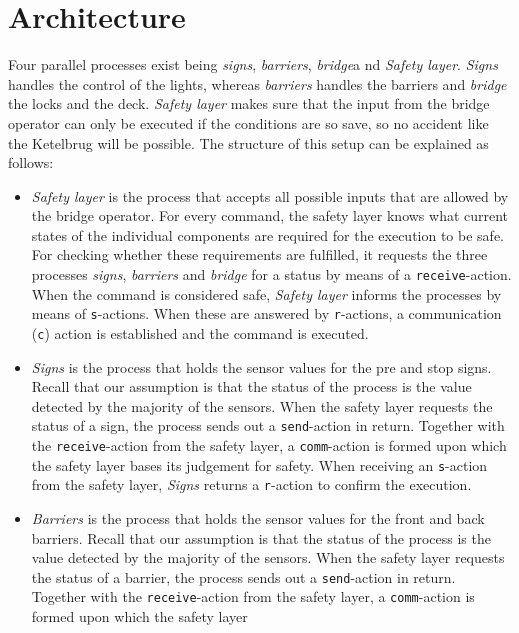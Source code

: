 \section{Architecture}
\label{sec:arch}

Four parallel processes exist being \emph{signs}, \emph{barriers},  \emph{bridge}a nd \emph{Safety layer}. \emph{Signs} handles the control of the lights, whereas \emph{barriers} handles the barriers and \emph{bridge} the locks and the deck. \emph{Safety layer} makes sure that the input from the bridge operator can only be executed if the conditions are so save, so no accident like the Ketelbrug will be possible. The structure of this setup can be explained as follows:
%
\begin{itemize}
	\item \emph{Safety layer} is the process that accepts all possible inputs that are allowed by the bridge operator. For every command, the safety layer knows what current states of the individual components are required for the 
	execution to be safe. For checking whether these requirements are fulfilled, it requests the three processes \emph{signs}, \emph{barriers} and \emph{bridge} for a status by means of a \texttt{receive}-action. 
	When the command is considered safe, \emph{Safety layer} informs the processes by means of \texttt{s}-actions. When these are answered by \texttt{r}-actions, a communication (\texttt{c}) action is established and the command 
	is executed.
	\item \emph{Signs} is the process that holds the sensor values for the pre and stop signs. Recall that our assumption is that the status of the process is the value detected by the majority of the sensors. When the safety layer 
	requests the status of a sign, the process sends out a \texttt{send}-action in return. Together with the \texttt{receive}-action from the safety layer, a \texttt{comm}-action is formed upon which the safety layer bases its 
	judgement for safety. When receiving an \texttt{s}-action from the safety layer, \emph{Signs} returns a \texttt{r}-action to confirm the execution.
	\item \emph{Barriers} is the process that holds the sensor values for the front and back barriers. Recall that our assumption is that the status of the process is the value detected by the majority of the sensors. When the 
	safety layer requests the status of a barrier, the process sends out a \texttt{send}-action in return. Together with the \texttt{receive}-action from the safety layer, a \texttt{comm}-action is formed upon which the safety layer 

\end{itemize}
